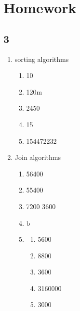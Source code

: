 \documentclass[11pt]{article}
\begin{document}
\section{Homework}
\label{sec:org01d45f6}
\subsection{3}
\label{sec:org1165011}
\begin{enumerate}
\item sorting algorithms
\begin{enumerate}
\item 10
\item 120m
\item 2450
\item 15
\item 154472232
\end{enumerate}
\item Join algorithms
\begin{enumerate}
\item 56400
\item 55400
\item 7200 3600
\item b
\item \begin{enumerate}
\item 5600
\item 8800
\item 3600
\item 3160000
\item 3000
\end{enumerate}
\end{enumerate}
\end{enumerate}
\end{document}
